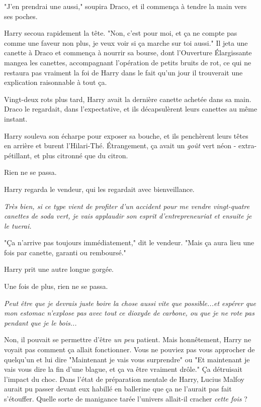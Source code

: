 "J'en prendrai une aussi," soupira Draco, et il commença à tendre la main vers ses poches.

Harry secoua rapidement la tête. "Non, c'est pour moi, et ça ne compte pas comme une faveur non plus, je veux voir si ça marche sur toi aussi." Il jeta une canette à Draco et commença à nourrir sa bourse, dont l'Ouverture Élargissante mangea les canettes, accompagnant l'opération de petits bruits de rot, ce qui ne restaura pas vraiment la foi de Harry dans le fait qu'un jour il trouverait une explication raisonnable à tout ça.

Vingt-deux rots plus tard, Harry avait la dernière canette achetée dans sa main. Draco le regardait, dans l'expectative, et ils décapsulèrent leurs canettes au même instant.

Harry souleva son écharpe pour exposer sa bouche, et ils penchèrent leurs têtes en arrière et burent l'Hilari-Thé. Étrangement, ça avait un \emph{goût}  vert néon - extra-pétillant, et plus citronné que du citron.

Rien ne se passa.

Harry regarda le vendeur, qui les regardait avec bienveillance.

\emph{Très bien, si ce type vient de profiter d'un accident pour me vendre vingt-quatre canettes de soda vert, je vais applaudir son esprit d'entrepreneuriat et ensuite je le tuerai.} 

"Ça n'arrive pas toujours immédiatement," dit le vendeur. "Mais ça aura lieu une fois par canette, garanti ou remboursé."

Harry prit une autre longue gorgée.

Une fois de plus, rien ne se passa.

\emph{Peut être que je devrais juste boire la chose aussi vite que possible...et espérer que mon estomac n'explose pas avec tout ce dioxyde de carbone, ou que je ne rote pas pendant que je le bois...} 

Non, il pouvait se permettre d'être \emph{un peu}  patient. Mais honnêtement, Harry ne voyait pas comment ça allait fonctionner. Vous ne pouviez pas vous approcher de quelqu'un et lui dire "Maintenant je vais vous surprendre" ou "Et maintenant je vais vous dire la fin d'une blague, et ça va être vraiment drôle." Ça détruisait l'impact du choc. Dans l'état de préparation mentale de Harry, Lucius Malfoy aurait pu passer devant eux habillé en ballerine que ça ne l'aurait pas fait s'étouffer. Quelle sorte de manigance tarée l'univers allait-il cracher \emph{cette fois}  ?


